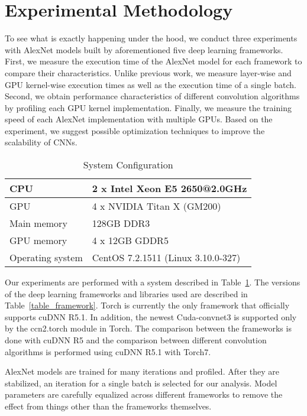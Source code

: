 \section{Experimental Methodology}
To see what is exactly happening under the hood, we conduct three experiments with AlexNet models built by aforementioned five deep learning frameworks. First, we measure the execution time of the AlexNet model for each framework to compare their characteristics. Unlike previous work, we measure layer-wise and GPU kernel-wise execution times as well as the execution time of a single batch. Second, we obtain performance characteristics of different convolution algorithms by profiling each GPU kernel implementation. Finally, we measure the training speed of each AlexNet implementation with multiple GPUs. Based on the experiment, we suggest possible optimization techniques to improve the scalability of CNNs. 

\begin{table}[htbp]
\centering
\caption{System Configuration}
\label{table_system}
\begin{scriptsize}
\begin{tabular}{|l|l|}
\hline\hline
CPU         & 2 x Intel Xeon E5 2650@2.0GHz \\\hline
GPU         & 4 x NVIDIA Titan X (GM200)    \\\hline
Main memory & 128GB DDR3                    \\\hline
GPU memory  & 4 x 12GB GDDR5                \\\hline
Operating system & CentOS 7.2.1511 (Linux 3.10.0-327)  \\\hline
\end{tabular}
\end{scriptsize}
\end{table}

Our experiments are performed with a system described in Table~\ref{table_system}. The versions of the deep learning frameworks and libraries used are described in Table~\ref{table_framework}. Torch is currently the only framework that officially supports cuDNN R5.1. In addition, the newest Cuda-convnet3 is supported only by the ccn2.torch module in Torch. The comparison between the frameworks is done with cuDNN R5 and the comparison between different convolution algorithms is performed using cuDNN R5.1 with Torch7.

AlexNet models are trained for many iterations and profiled. After they are stabilized, an iteration for a single batch is selected for our analysis. Model parameters are carefully equalized across different frameworks to remove the effect from things other than the frameworks themselves.